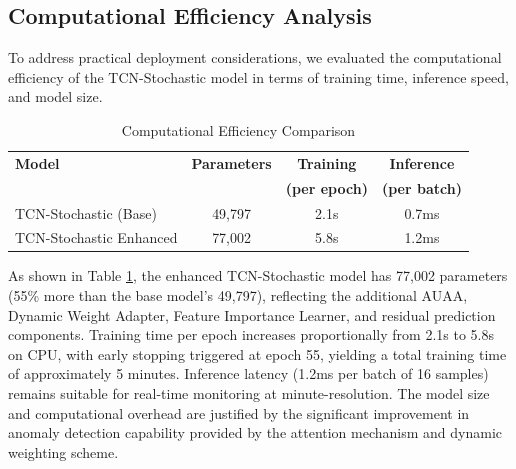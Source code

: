 \subsection{Computational Efficiency Analysis}
\indent
To address practical deployment considerations, we evaluated the computational efficiency of the TCN-Stochastic model in terms of training time, inference speed, and model size.

\begin{table}[h]
\centering
\caption{Computational Efficiency Comparison}
\label{table:computational_efficiency}
\begin{tabular}{|l|c|c|c|}
\hline
\textbf{Model} & \textbf{Parameters} & \textbf{Training} & \textbf{Inference} \\
& & \textbf{(per epoch)} & \textbf{(per batch)} \\ \hline
TCN-Stochastic (Base) & 49,797 & 2.1s & 0.7ms \\ \hline
TCN-Stochastic Enhanced & 77,002 & 5.8s & 1.2ms \\ \hline
\end{tabular}
\end{table}

\indent
As shown in Table \ref{table:computational_efficiency}, the enhanced TCN-Stochastic model has 77,002 parameters (55\% more than the base model's 49,797), reflecting the additional AUAA, Dynamic Weight Adapter, Feature Importance Learner, and residual prediction components. Training time per epoch increases proportionally from 2.1s to 5.8s on CPU, with early stopping triggered at epoch 55, yielding a total training time of approximately 5 minutes. Inference latency (1.2ms per batch of 16 samples) remains suitable for real-time monitoring at minute-resolution. The model size and computational overhead are justified by the significant improvement in anomaly detection capability provided by the attention mechanism and dynamic weighting scheme.